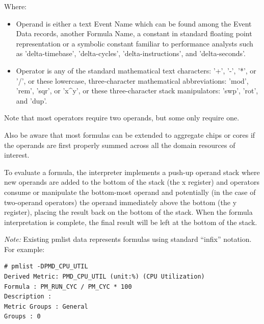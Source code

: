 \documentclass[14]{article}
\begin{document}
Where:
\begin{itemize}
\item Operand is either a text Event Name which can be found among the Event
  Data records, another Formula Name, a constant in standard floating point
  representation or a symbolic constant familiar to performance analysts such as
  'delta-timebase', 'delta-cycles', 'delta-instructions', and 'delta-seconds'.
\item Operator is any of the standard mathematical text characters: '+', '-',
  '*', or '/', or these lowercase, three-character mathematical abbreviations:
  'mod', 'rem', 'sqr', or 'x\^{}y', or these three-character stack manipulators:
  'swp', 'rot', and 'dup'.

\end{itemize}
Note that most operators require two operands, but some only require one.

Also be aware that most formulas can be extended to aggregate chips or cores if
the operands are first properly summed across all the domain resources of
interest.

To evaluate a formula, the interpreter implements a push-up operand stack where
new operands are added to the bottom of the stack (the x register) and operators
consume or manipulate the bottom-most operand and potentially (in the case of
two-operand operators) the operand immediately above the bottom (the y
register), placing the result back on the bottom of the stack. When the formula
interpretation is complete, the final result will be left at the bottom of the
stack.

\textit{Note:} Existing pmlist data represents formulas using standard “infix”
notation. For example:

\begin{verbatim}
# pmlist -DPMD_CPU_UTIL
Derived Metric: PMD_CPU_UTIL (unit:%) (CPU Utilization)
Formula : PM_RUN_CYC / PM_CYC * 100
Description :
Metric Groups : General
Groups : 0
\end{verbatim}
\end{document}
